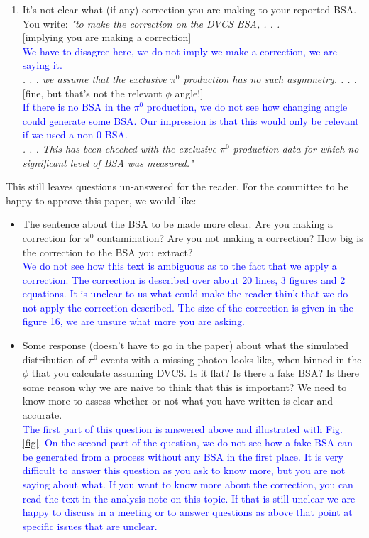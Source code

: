 \documentclass[a4paper,11pt,twoside]{article}
\begin{document}
\begin{enumerate}
\item It's not clear what (if any) correction you are making to your reported BSA. You write:
\textit{"to make the correction on the DVCS BSA, . . .} \\
 $[$implying you are making a correction$]$ \\
   \textcolor{blue}{We have to disagree here, we do not imply we make a correction, we are saying it.} \\
\textit{. . . we assume that the exclusive $\pi^0$ production has no such asymmetry. . . .} \\
 $[$fine, but that's not the relevant $\phi$ angle!$]$ \\
   \textcolor{blue}{If there is no BSA in the  $\pi^0$ production, we do not see how changing angle could generate some BSA. Our impression is that this would only be relevant if we used a non-0 BSA.} \\
\textit{. . . This has been checked with the exclusive $\pi^0$ production data for which no significant level of BSA was
measured."} \\
\end{enumerate}
This still leaves questions un-answered for the reader. For the committee to be happy to approve this paper, we
would like:
\begin{itemize}
\item The sentence about the BSA to be made more clear. Are you making a correction for $\pi^0$ contamination? Are
you not making a correction? How big is the correction to the BSA you extract? \\
  \textcolor{blue}{We do not see how this text is ambiguous as to the fact that we apply a correction. The correction is described over about 20 lines, 3 figures and 2 equations. It is unclear to us what could make the reader think that we do not apply the correction described. The size of the correction is given in the figure 16, we are unsure what more you are asking.}
\item Some response (doesn't have to go in the paper) about what the simulated distribution of $\pi^0$ events with a
missing photon looks like, when binned in the $\phi$ that you calculate assuming DVCS. Is it flat? Is there a fake
BSA? Is there some reason why we are naive to think that this is important? We need to know more to assess
whether or not what you have written is clear and accurate. \\
  \textcolor{blue}{The first part of this question is answered above and illustrated with Fig. \ref{fig}. On the second part of the question, we do not see how a fake BSA can be generated from a process without any BSA in the first place. It is very difficult to answer this question as you ask to know more, but you are not saying about what. If you want to know more about the correction, you can read the text in the analysis note on this topic. If that is still unclear we are happy to discuss in a meeting or to answer questions as above that point at specific issues that are unclear.}
\end{itemize}
\end{document}
